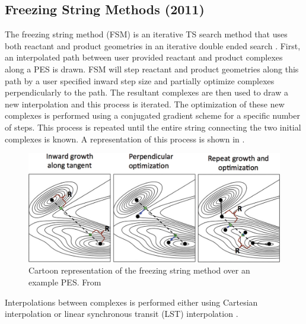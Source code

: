 \documentclass[preprint, 11pt]{elsarticle} %
\begin{document}
\subsection{Freezing String Methods (2011)}

The freezing string method (FSM) is an iterative TS search method that uses both reactant and product geometries in an iterative double ended search \cite{Behn:2011}.
First, an interpolated path between user provided reactant and product complexes along a PES is drawn.
FSM will step reactant and product geometries along this path by a user specified inward step size and partially optimize complexes perpendicularly to the path. 
The resultant complexes are then used to draw a new interpolation and this process is iterated.
The optimization of these new complexes is performed using a conjugated gradient scheme for a specific number of steps. 
This process is repeated until the entire string connecting the two initial complexes is known. 
A representation of this process is shown in . 

\begin{figure}[htbp]
    \centering
    \includegraphics[width=5in]{fsm}
    \caption{Cartoon representation of the freezing string method over an example PES. From \cite{Behn:2011}}
    \label{fig:fsm}
\end{figure}

Interpolations between complexes is performed either using Cartesian interpolation or linear synchronous transit (LST) interpolation \cite{HALGREN:1977, Peng:1993}. 
\end{document}
